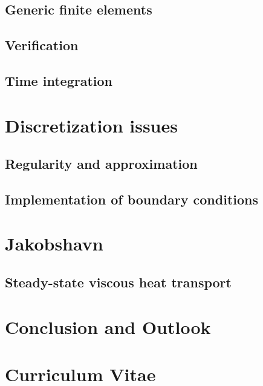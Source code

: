 \documentclass[a4paper,twoside,11pt,pdftex]{report}
\begin{document}
\section{Generic finite elements}\label{sec:femassembly}


\section{Verification}\label{sec:verification}


\section{Time integration}\label{sec:timestep}


\cleardoublepage
\chapter{Discretization issues}\label{chap:discretization}

\section{Regularity and approximation}\label{sec:regularity}


\section{Implementation of boundary conditions}\label{sec:slip}


\cleardoublepage
% 

\chapter{Jakobshavn}\label{chap:jakobshavn}


\section{Steady-state viscous heat transport}\label{sec:vht}


\cleardoublepage

\chapter{Conclusion and Outlook}\label{chap:outlook}

\cleardoublepage



\cleardoublepage

\appendix

\pagestyle{plain}
\chapter*{Curriculum Vitae}
\end{document}
